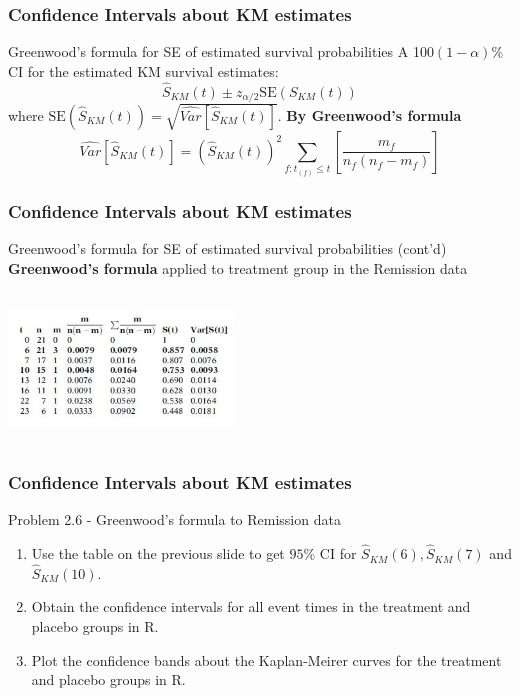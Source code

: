 \documentclass{beamer}
\theoremstyle{definition}
\begin{document}
\begin{frame}
\frametitle{Confidence Intervals about KM estimates}
\begin{block}{Greenwood's formula for SE of estimated survival probabilities}
A 100$(1-\alpha)\%$ CI for the estimated KM survival estimates: 
\[
\hat{S}_{KM}(t) \pm z_{\alpha/2}\text{SE}({S}_{KM}(t))
\]
where $\text{SE}(\hat{S}_{KM}(t)) = \sqrt{\hat{Var}[\hat{S}_{KM}(t)]}.$
\textbf{By Greenwood's formula}
\[
\hat{Var}[\hat{S}_{KM}(t)] = (\hat{S}_{KM}(t))^2 \sum_{f:t_{(f)} \le t}\left[\frac{m_f}{n_f(n_f-m_f)}\right]
\] 
\end{block}
\end{frame}

\begin{frame}
\frametitle{Confidence Intervals about KM estimates}
\begin{block}{Greenwood's formula for SE of estimated survival probabilities (cont'd)}
\textbf{Greenwood's formula} applied to treatment group in the Remission data
\begin{center} 
   \includegraphics[width =6cm, height=4cm]{Ch2_Greenwoods.JPG}
\end{center} 
\end{block}
\end{frame}

\begin{frame}
\frametitle{Confidence Intervals about KM estimates}
\begin{block}{Problem 2.6 - Greenwood's formula to Remission data}
\begin{enumerate}
\item Use the table on the previous slide to get $95\%$ CI for $\hat{S}_{KM}(6), \hat{S}_{KM}(7)$ and $\hat{S}_{KM}(10)$.
\item Obtain the confidence intervals for all event times in the treatment and placebo groups in R.
\item Plot the confidence bands about the Kaplan-Meirer curves for the treatment and placebo groups in R.
\end{enumerate}
\end{block}
\end{frame} 
\end{document}
